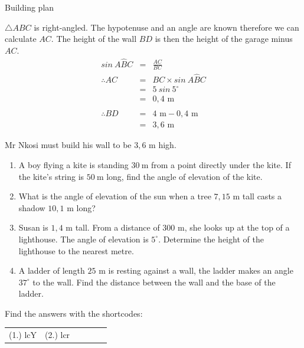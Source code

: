 \begin{wex}{Building plan}
{}{
$\triangle ABC$ is right-angled. The hypotenuse and an angle are known therefore we can calculate $AC$. The height of the wall $BD$ is then the height of the garage minus $AC$.
\begin{eqnarray*}
 sin~A\hat{B}C &=& \frac{AC}{BC} \\
\therefore AC &=& BC \times sin~A\hat{B}C\\
&=& 5~sin~5^{\circ}\\
&=& 0,4\mbox{ m}\\
\\
\therefore BD&=& 4\mbox{ m}-0,4\mbox{ m}\\
&=& 3,6\mbox{ m}
\end{eqnarray*}


Mr Nkosi must build his wall to be $3,6$ m high.
}
\end{wex}

\begin{exercises}{}
{
\begin{enumerate}[noitemsep, label=\textbf{\arabic*}. ] 

\item A boy flying a kite is standing $30~$m from a point directly under the kite. If the kite's string is $50~$m long, find the angle of elevation of the kite.
\item What is the angle of elevation of the sun when a tree $7,15$ m tall casts a shadow $10,1$ m long?
\item Susan is $1,4$ m tall. From a distance of $300$ m, she looks up at the top of a lighthouse. The angle of elevation is $5^{\circ}$. Determine the height of the lighthouse to the nearest metre.
\item A ladder of length $25$ m is resting against a wall, the ladder makes an angle $37^{\circ}$ to the wall. Find the distance between the wall and the base of the ladder. 

\end{enumerate}

\par {} Find the answers with the shortcodes:
\par \begin{tabular}[h]{cccccc}
(1.) lcY  &  (2.) lcr  & \end{tabular}
    
}
\end{exercises} 

